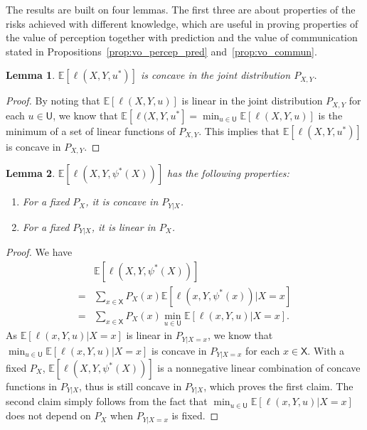 \documentclass{article}
\newtheorem{lemma}{Lemma}
\newcommand{\E}{\mathbb{E}}
\def\sU{{\mathsf U}}
\def\sX{{\mathsf X}}
\begin{document}
The results are built on four lemmas.
The first three are about properties of the risks achieved with different knowledge, which are useful in proving properties of the value of perception together with prediction and the value of communication stated in Propositions~\ref{prop:vo_percep_pred} and~\ref{prop:vo_commun}.

\begin{lemma}\label{lm:R(X,Y)}
$\E[\ell(X,Y,u^*)]$ is concave in the joint distribution $P_{X,Y}$.
\end{lemma}
\begin{proof}
By noting that $\E[\ell(X,Y,u)]$ is linear in the joint distribution $P_{X,Y}$ for each $u\in\sU$, we know that $ \E[\ell(X,Y,u^*] = \min_{u\in\sU}\E[\ell(X,Y,u)]$ is the minimum of a set of linear functions of $P_{X,Y}$. This implies that $\E[\ell(X,Y,u^*)]$ is concave in $P_{X,Y}$.   
\end{proof}

\begin{lemma}\label{lm:R(X,Y|X)}
$\E[\ell(X,Y,\psi^*(X))]$ has the following properties:
\begin{enumerate}[leftmargin=*]%
    \item 
    For a fixed $P_{X}$, it is concave in $P_{Y|X}$.
    \item 
    For a fixed $P_{Y|X}$, it is linear in $P_X$.
\end{enumerate}
\end{lemma}
\begin{proof}
We have
\begin{align}
&\E[\ell(X,Y,\psi^*(X))] \nonumber \\
=& \sum_{x\in\sX}P_X(x) \E[\ell(x,Y,\psi^*(x))|X=x] \\
=& \sum_{x\in\sX} P_X(x) \min_{u\in\sU} \E[\ell(x,Y,u)|X=x] .
\end{align}
As $\E[\ell(x,Y,u)|X=x]$ is linear in $P_{Y|X=x}$, we know that $\min_{u\in\sU} \E[\ell(x,Y,u)|X=x]$ is concave in $P_{Y|X=x}$ for each $x\in\sX$.
With a fixed $P_X$, $\E[\ell(X,Y,\psi^*(X))]$ is a nonnegative linear combination of concave functions in $P_{Y|X}$, thus is still concave in $P_{Y|X}$, which proves the first claim.
The second claim simply follows from the fact that $\min_{u\in\sU} \E[\ell(x,Y,u)|X=x]$ does not depend on $P_X$ when $P_{Y|X=x}$ is fixed.
\end{proof}
\end{document}
